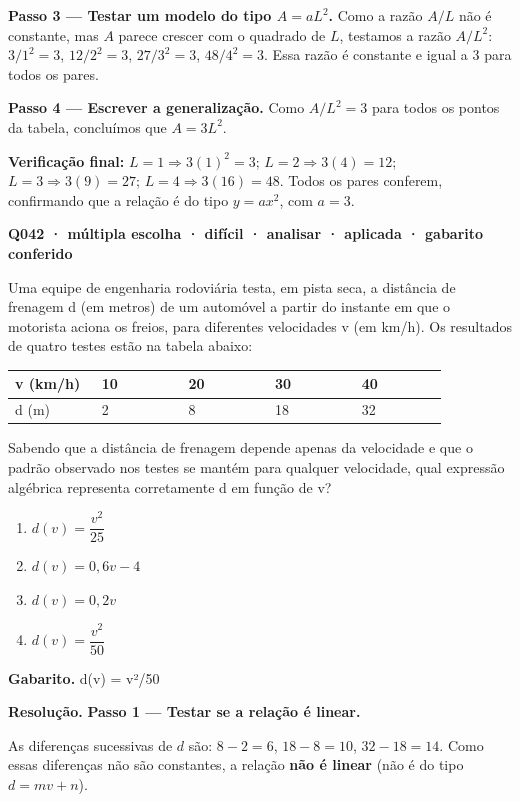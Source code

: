 \documentclass[11pt,a4paper]{article}
\begin{document}
\textbf{Passo 3 — Testar um modelo do tipo $A = aL^2$.}
Como a razão $A/L$ não é constante, mas $A$ parece crescer com o quadrado de $L$, testamos a razão $A/L^2$: $3/1^2=3$, $12/2^2=3$, $27/3^2=3$, $48/4^2=3$. Essa razão é constante e igual a $3$ para todos os pares.

\textbf{Passo 4 — Escrever a generalização.}
Como $A/L^2 = 3$ para todos os pontos da tabela, concluímos que $A = 3L^2$.

\textbf{Verificação final:} $L=1\Rightarrow 3(1)^2=3$; $L=2\Rightarrow 3(4)=12$; $L=3\Rightarrow 3(9)=27$; $L=4\Rightarrow 3(16)=48$. Todos os pares conferem, confirmando que a relação é do tipo $y=ax^2$, com $a=3$.

\bigskip\noindent\textbf{Q042 · múltipla escolha · difícil · analisar · aplicada · gabarito conferido}\par\nopagebreak
Uma equipe de engenharia rodoviária testa, em pista seca, a distância de frenagem d (em metros) de um automóvel a partir do instante em que o motorista aciona os freios, para diferentes velocidades v (em km/h). Os resultados de quatro testes estão na tabela abaixo:

\begin{center}
\begin{tabular}{|p{0.172\linewidth}|p{0.172\linewidth}|p{0.172\linewidth}|p{0.172\linewidth}|p{0.172\linewidth}|}
\hline
\textbf{v (km/h)} & \textbf{10} & \textbf{20} & \textbf{30} & \textbf{40} \\
\hline
d (m) & 2 & 8 & 18 & 32 \\
\hline
\end{tabular}
\end{center}

Sabendo que a distância de frenagem depende apenas da velocidade e que o padrão observado nos testes se mantém para qualquer velocidade, qual expressão algébrica representa corretamente d em função de v?
\begin{enumerate}[label=(\alph*)]
\item $d(v) = \dfrac{v^2}{25}$
\item $d(v) = 0{,}6v - 4$
\item $d(v) = 0{,}2v$
\item $d(v) = \dfrac{v^2}{50}$
\end{enumerate}

\textbf{Gabarito.} d(v) = v²/50

\textbf{Resolução.} \textbf{Passo 1 — Testar se a relação é linear.}

As diferenças sucessivas de $d$ são: $8-2=6$, $18-8=10$, $32-18=14$. Como essas diferenças não são constantes, a relação \textbf{não é linear} (não é do tipo $d = mv + n$).
\end{document}
